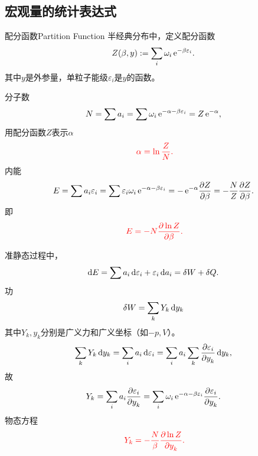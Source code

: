 \subsection{宏观量的统计表达式}
\begin{definition}{配分函数}{Partition Function}
	半经典分布中，定义配分函数
	\begin{align}
		Z(\beta,y):=\sum_i\omega_i\mathop{}\!\mathrm{e}^{-\beta\varepsilon_i}.
	\end{align}
	其中$y$是外参量，单粒子能级$\varepsilon_i$是$y$的函数。
\end{definition}
分子数
\[
	N=\sum a_i=\sum\omega_i\mathop{}\!\mathrm{e}^{-\alpha-\beta\varepsilon_i}=Z\mathop{}\!\mathrm{e}^{-\alpha},
\]
用配分函数$Z$表示$\alpha$
\begin{align}
	\;\textcolor{red}{\alpha=\ln\frac ZN.}
\end{align}
内能
\[
	E=\sum a_i\varepsilon_i=\sum\varepsilon_i\omega_i\e{-\alpha-\beta\varepsilon_i}=-\e{-\alpha}\pv Z\beta=-\frac NZ\pv Z\beta.
\]
即
\begin{align}
	\;\textcolor{red}{E=-N\frac{\partial^{\;\!\!}\ln Z}{\partial \beta^{\;\!\!}}.}
\end{align}

准静态过程中，
\[
	\mathop{}\!\mathrm{d} E=\sum a_i\mathop{}\!\mathrm{d}\varepsilon_i+\varepsilon_i\mathop{}\!\mathrm{d} a_i=\delta W+\delta Q.
\]
功
\[
	\delta W=\sum_kY_k\mathop{}\!\mathrm{d} y_k
\]
其中$Y_k,y_k$分别是广义力和广义坐标（如$-p,V$）。
\[
	\sum_kY_k\mathop{}\!\mathrm{d} y_k=\sum_ia_i\mathop{}\!\mathrm{d}\varepsilon_i=\sum_i a_i\sum_k\frac{\partial^{\;\!\!}\varepsilon_i}{\partial y_k^{\;\!\!}}\mathop{}\!\mathrm{d} y_k,
\]
故
\[
	Y_k=\sum_ia_i\pv{\varepsilon_i}{y_k}=\sum_i\omega_i\e{-\alpha-\beta\varepsilon_i}\pv{\varepsilon_i}{y_k}.
\]
物态方程
\begin{align}
	\;\textcolor{red}{Y_k=-\frac N\beta\frac{\partial^{\;\!\!}\ln Z}{\partial y_k^{\;\!\!}}.}
\end{align}

